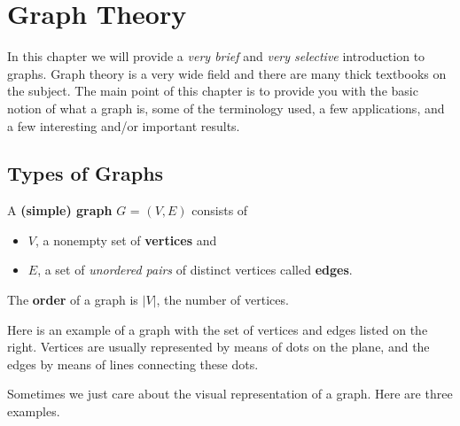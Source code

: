 

\chapter{Graph Theory}\label{ch:graphs}

In this chapter we will provide a {\em very brief} and {\em very selective} introduction
to graphs.  Graph theory is a very wide field and there are many thick textbooks on the subject.
The main point of this chapter is to provide you
with the basic notion of what a graph is, some of the terminology used, a few applications,
and a few interesting and/or important results.

\section{Types of Graphs}\label{sec:graphTypes}
\begin{df}
A {\bf (simple) graph} $G$ = $(V,E)$ consists of 
\begin{itemize}
\setlength{\itemsep}{1pt}
\item
$V$, a nonempty set of {\bf vertices} and 
\item 
$E$, a set of {\em unordered pairs} of 
distinct vertices called {\bf edges}.
\end{itemize}
The {\bf order} of a graph is $|V|$, the number of vertices.
\end{df}

\begin{exa}
Here is an example of a graph with the set of vertices and edges listed on the right.
Vertices are usually represented by means of dots on the plane,
and the edges by means of lines connecting these dots.

\vspace*{-.1in}
\begin{center}
\end{center}
\end{exa}

\begin{exa}
Sometimes we just care about the visual representation of a graph.  Here are three examples.

\vspace*{-.25in}
\begin{center}
\end{center}
\end{exa}


